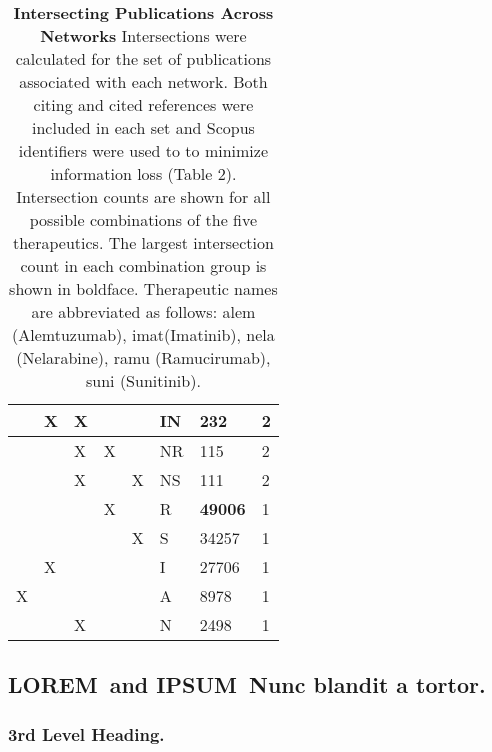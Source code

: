 \documentclass[10pt,letterpaper]{article}
\newcommand{\lorem}{{\bf LOREM}}
\newcommand{\ipsum}{{\bf IPSUM}}
\begin{document}
\begin{table}[!ht]
{\begin{tabular}{|l| l| l| l| l| l| l| l|}
& X & X &  &  & IN & 232 & 2 \\ 
\hline
&  & X & X &  & NR & 115 & 2 \\ 
\hline 
 &  & X &  & X & NS & 111 & 2 \\ 
\hline
&  &  & X &  & R & \textbf{49006} & 1 \\ 
\hline 
&  &  &  & X & S & 34257 & 1 \\ 
\hline 
& X &  &  &  & I & 27706 & 1 \\ 
\hline
X &  &  &  &  & A & 8978 & 1 \\ 
\hline
&  & X &  &  & N & 2498 & 1 \\ 
\hline
\end{tabular}}
\vspace{2.5 mm}
\caption{
{\bf Intersecting Publications Across Networks} Intersections were calculated for the set of publications associated with each network. Both citing and cited references were included in each set and  Scopus identifiers were used to to minimize information loss (Table 2). Intersection counts are shown for all possible combinations of the five therapeutics. The largest intersection count in each combination group is shown in boldface. Therapeutic names are abbreviated as follows: alem (Alemtuzumab), imat(Imatinib), nela (Nelarabine), ramu (Ramucirumab), suni (Sunitinib). }







\label{table3}
\end{table}

\subsection*{\lorem\ and \ipsum\ Nunc blandit a tortor.}
\subsubsection*{3rd Level Heading.} 
\end{document}
